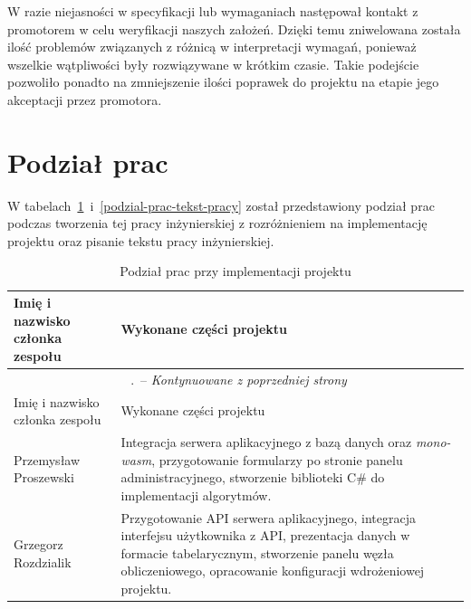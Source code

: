 \documentclass[a4paper,11pt,twoside]{report}
\renewcommand*{\thetable}{\arabic{chapter}.\arabic{table}}
\theoremstyle{definition}
\begin{document}
    W razie niejasności w specyfikacji lub wymaganiach następował kontakt z promotorem w celu
    weryfikacji naszych założeń.
    Dzięki temu zniwelowana została ilość problemów związanych z różnicą w interpretacji wymagań,
    ponieważ wszelkie wątpliwości były rozwiązywane w krótkim czasie.
    Takie podejście pozwoliło ponadto na zmniejszenie ilości poprawek do projektu na etapie jego
    akceptacji przez promotora.

\section{Podział prac}
    \label{podzial-prac}
    
    W tabelach~\ref{podzial-prac-implementacja}~i~\ref{podzial-prac-tekst-pracy} został przedstawiony
    podział prac podczas tworzenia tej pracy inżynierskiej z rozróżnieniem na implementację projektu
    oraz pisanie tekstu pracy inżynierskiej.
    
    \begin{longtable}{| p{} | p{} |}
        \caption{Podział prac przy implementacji projektu}
        \label{podzial-prac-implementacja} \\
        \hline
        Imię i nazwisko członka zespołu & Wykonane części projektu \\ \hline
        \endfirsthead
        \multicolumn{2}{c}{\tablename\ \thetable\ -- \textit{Kontynuowane z poprzedniej strony}} \\
        \hline
        Imię i nazwisko członka zespołu & Wykonane części projektu \\ \hline
        \endhead
        
        Przemysław Proszewski &
        Integracja serwera aplikacyjnego z bazą danych oraz \textit{mono-wasm}, przygotowanie formularzy
        po stronie panelu administracyjnego, stworzenie biblioteki C\# do implementacji algorytmów. \\ \hline
        
        Grzegorz Rozdzialik &
        Przygotowanie API serwera aplikacyjnego, integracja interfejsu użytkownika z API,
        prezentacja danych w formacie tabelarycznym, stworzenie panelu węzła obliczeniowego,
        opracowanie konfiguracji wdrożeniowej projektu. \\ \hline
    \end{longtable}
    
\end{document}
